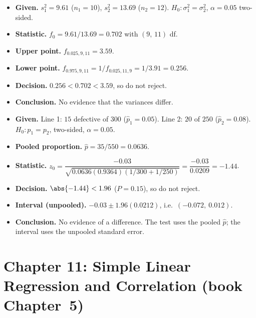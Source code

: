 \begin{example}
\begin{itemize}
  \item \textbf{Given.} $s_1^2=9.61$ ($n_1=10$), $s_2^2=13.69$ ($n_2=12$). $H_0:\sigma_1^2=\sigma_2^2$, $\alpha=0.05$ two-sided.
  \item \textbf{Statistic.} $f_0=9.61/13.69=0.702$ with $(9,\,11)$ df.
  \item \textbf{Upper point.} $f_{0.025,9,11}=3.59$.
  \item \textbf{Lower point.} $f_{0.975,9,11}=1/f_{0.025,11,9}=1/3.91=0.256$.
  \item \textbf{Decision.} $0.256<0.702<3.59$, so do not reject.
  \item \textbf{Conclusion.} No evidence that the variances differ.
\end{itemize}
\end{example}

\begin{example}
\begin{itemize}
  \item \textbf{Given.} Line 1: $15$ defective of $300$ ($\hat{p}_1=0.05$). Line 2: $20$ of $250$ ($\hat{p}_2=0.08$). $H_0:p_1=p_2$, two-sided, $\alpha=0.05$.
  \item \textbf{Pooled proportion.} $\hat{p}=35/550=0.0636$.
  \item \textbf{Statistic.} $z_0=\dfrac{-0.03}{\sqrt{0.0636(0.9364)(1/300+1/250)}}=\dfrac{-0.03}{0.0209}=-1.44$.
  \item \textbf{Decision.} $\abs{-1.44}<1.96$ ($P=0.15$), so do not reject.
  \item \textbf{Interval (unpooled).} $-0.03\pm1.96(0.0212)$, i.e.\ $(-0.072,\ 0.012)$.
  \item \textbf{Conclusion.} No evidence of a difference. The test uses the pooled $\hat{p}$; the interval uses the unpooled standard error.
\end{itemize}
\end{example}

\section{Chapter 11: Simple Linear Regression and Correlation (book Chapter~5)}

